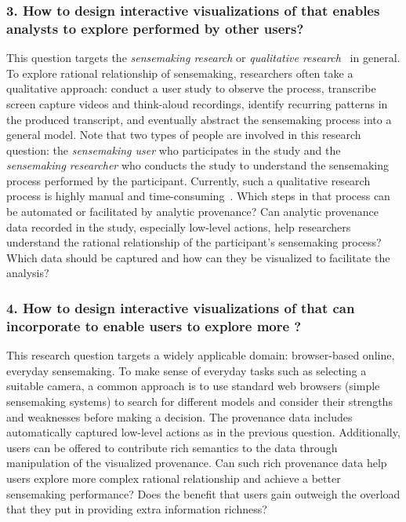 \subsubsection*{3. How to design interactive visualizations of  that enables analysts to explore  performed by other users?}
This question targets the \emph{sensemaking research} or \emph{qualitative research}~\cite{Adams2008} in general. To explore rational relationship of sensemaking, researchers often take a qualitative approach: conduct a user study to observe the process, transcribe screen capture videos and think-aloud recordings, identify recurring patterns in the produced transcript, and eventually abstract the sensemaking process into a general model. Note that two types of people are involved in this research question: the \emph{sensemaking user} who participates in the study and the \emph{sensemaking researcher} who conducts the study to understand the sensemaking process performed by the participant. Currently, such a qualitative research process is highly manual and time-consuming~\cite{Wong2002}. Which steps in that process can be automated or facilitated by analytic provenance? Can analytic provenance data recorded in the study, especially low-level actions, help researchers understand the rational relationship of the participant's sensemaking process? Which data should be captured and how can they be visualized to facilitate the analysis? 

\subsubsection*{4. How to design interactive visualizations of  that can incorporate  to enable users to explore more ?}

This research question targets a widely applicable domain: browser-based online, everyday sensemaking. To make sense of everyday tasks such as selecting a suitable camera, a common approach is to use standard web browsers (simple sensemaking systems) to search for different models and consider their strengths and weaknesses before making a decision. The provenance data includes automatically captured low-level actions as in the previous question. Additionally, users can be offered to contribute rich semantics to the data through manipulation of the visualized provenance. Can such rich provenance data help users explore more complex rational relationship and achieve a better sensemaking performance? Does the benefit that users gain outweigh the overload that they put in providing extra information richness?

